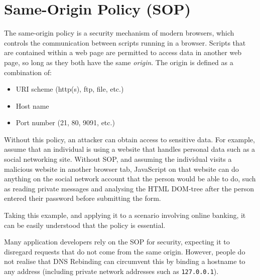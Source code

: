 \chapter{Same-Origin Policy (SOP)}

The same-origin policy is a security mechanism of modern browsers, which
controls the communication between scripts running in a browser. Scripts that
are contained within a web page are permitted to access data in another web
page, so long as they both have the same \emph{origin}. The origin is defined
as a combination of:
\begin{itemize}
	\item{URI scheme (http(s), ftp, file, etc.)}
	\item{Host name}
	\item{Port number (21, 80, 9091, etc.)}
\end{itemize}

Without this policy, an attacker can obtain access to sensitive data. For
example, assume that an individual is using a website that handles personal
data such as a social networking site. Without SOP, and assuming the
individual visits a malicious website in another browser tab, JavaScript on
that website can do anything on the social network account that the person
would be able to do, such as reading private messages and analysing the HTML
DOM-tree after the person entered their password before submitting the form.

Taking this example, and applying it to a scenario involving online banking, it
can be easily understood that the policy is essential.

Many application developers rely on the SOP for security, expecting it to
disregard requests that do not come from the same origin. However, people do
not realise that DNS Rebinding can circumvent this by binding a hostname to
any address (including private network addresses such as \texttt{127.0.0.1}).
